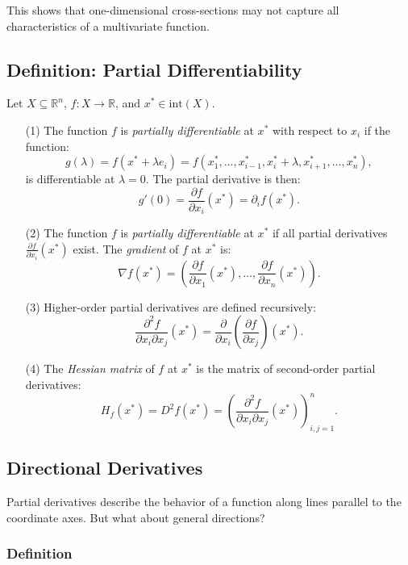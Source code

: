 \documentclass{article}
\begin{document}
This shows that one-dimensional cross-sections may not capture all characteristics of a multivariate function.

\subsection*{Definition: Partial Differentiability}

Let \( X \subseteq \mathbb{R}^n \), \( f: X \to \mathbb{R} \), and \( x^* \in \text{int}(X) \).

\begin{itemize}
    \item[(1)] The function \( f \) is \textit{partially differentiable} at \( x^* \) with respect to \( x_i \) if the function:
    \[ g(\lambda) = f(x^* + \lambda e_i) = f(x_1^*, \dots, x_{i-1}^*, x_i^* + \lambda, x_{i+1}^*, \dots, x_n^*), \]
    is differentiable at \( \lambda = 0 \). The partial derivative is then:
    \[ g'(0) = \frac{\partial f}{\partial x_i}(x^*) = \partial_i f(x^*). \]

    \item[(2)] The function \( f \) is \textit{partially differentiable} at \( x^* \) if all partial derivatives \( \frac{\partial f}{\partial x_i}(x^*) \) exist. The \textit{gradient} of \( f \) at \( x^* \) is:
    \[ \nabla f(x^*) = \left( \frac{\partial f}{\partial x_1}(x^*), \dots, \frac{\partial f}{\partial x_n}(x^*) \right). \]

    \item[(3)] Higher-order partial derivatives are defined recursively:
    \[ \frac{\partial^2 f}{\partial x_i \partial x_j}(x^*) = \frac{\partial}{\partial x_i} \left( \frac{\partial f}{\partial x_j} \right)(x^*). \]

    \item[(4)] The \textit{Hessian matrix} of \( f \) at \( x^* \) is the matrix of second-order partial derivatives:
    \[ H_f(x^*) = D^2 f(x^*) = \left( \frac{\partial^2 f}{\partial x_i \partial x_j}(x^*) \right)_{i,j=1}^n. \]
\end{itemize}

\subsection{Directional Derivatives}

Partial derivatives describe the behavior of a function along lines parallel to the coordinate axes. But what about general directions?

\subsubsection*{Definition}
\end{document}
